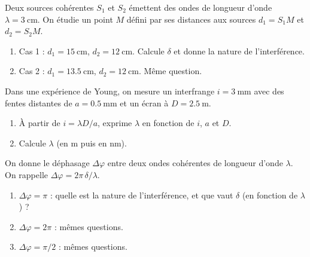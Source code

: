 \documentclass[11pt,a4paper]{article}
\begin{document}
\begin{exo}
Deux sources cohérentes $S_1$ et $S_2$ émettent des ondes de longueur d'onde
$\lambda=\SI{3}{\centi\metre}$. On étudie un point $M$ défini par ses distances aux sources
$d_1=S_1M$ et $d_2=S_2M$.
\begin{center}
\end{center}
\begin{enumerate}[label=\alph*)]
  \item Cas 1 : $d_1=\SI{15}{\centi\metre}$, $d_2=\SI{12}{\centi\metre}$. Calcule $\delta$ et
        donne la nature de l'interférence.
  \item Cas 2 : $d_1=\SI{13.5}{\centi\metre}$, $d_2=\SI{12}{\centi\metre}$. Même question.
\end{enumerate}
\end{exo}

\begin{exo}
Dans une expérience de Young, on mesure un interfrange $i=\SI{3}{\milli\metre}$ avec des fentes
distantes de $a=\SI{0.5}{\milli\metre}$ et un écran à $D=\SI{2.5}{\metre}$.
\begin{enumerate}[label=\alph*)]
  \item À partir de $i=\lambda D/a$, exprime $\lambda$ en fonction de $i$, $a$ et $D$.
  \item Calcule $\lambda$ (en \si{\metre} puis en \si{\nano\metre}).
\end{enumerate}
\end{exo}

\begin{exo}
On donne le déphasage $\Delta\varphi$ entre deux ondes cohérentes de longueur d'onde $\lambda$.
On rappelle $\Delta\varphi=2\pi\,\delta/\lambda$.
\begin{enumerate}[label=\alph*)]
  \item $\Delta\varphi=\pi$ : quelle est la nature de l'interférence, et que vaut $\delta$
        (en fonction de $\lambda$) ?
  \item $\Delta\varphi=2\pi$ : mêmes questions.
  \item $\Delta\varphi=\pi/2$ : mêmes questions.
\end{enumerate}
\end{exo}
\end{document}
